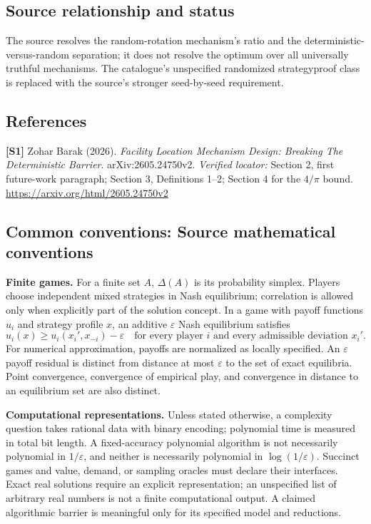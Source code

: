 \documentclass[11pt,a4paper]{article}
\begin{document}
\subsection*{Source relationship and status}
The source resolves the random-rotation mechanism's ratio and the deterministic-versus-random separation; it does not resolve the optimum over all universally truthful mechanisms. The catalogue's unspecified randomized strategyproof class is replaced with the source's stronger seed-by-seed requirement.
\subsection*{References}
\begingroup\footnotesize\raggedright
\textbf{[S1]} Zohar Barak (2026). \emph{Facility Location Mechanism Design: Breaking The Deterministic Barrier}. arXiv:2605.24750v2. \textit{Verified locator:} Section 2, first future-work paragraph; Section 3, Definitions 1--2; Section 4 for the $4/\pi$ bound. \url{https://arxiv.org/html/2605.24750v2}
\par\endgroup

\subsection*{Common conventions: Source mathematical conventions}

\textbf{Finite games.} For a finite set $A$, $\Delta(A)$ is its probability
simplex. Players choose independent mixed strategies in Nash equilibrium;
correlation is allowed only when explicitly part of the solution concept.
In a game with payoff functions $u_i$ and strategy profile $x$, an additive
$\varepsilon$ Nash equilibrium satisfies
\[
 u_i(x)\geq u_i(x_i',x_{-i})-\varepsilon
 \quad\text{for every player $i$ and every admissible deviation $x_i'$}.
\]
For numerical approximation, payoffs are normalized as locally specified.
An $\varepsilon$ payoff residual is distinct from distance at most
$\varepsilon$ to the set of exact equilibria. Point convergence, convergence
of empirical play, and convergence in distance to an equilibrium set are
also distinct.

\textbf{Computational representations.} Unless stated otherwise, a complexity
question takes rational data with binary encoding; polynomial time is measured
in total bit length. A fixed-accuracy polynomial algorithm is not necessarily
polynomial in $1/\varepsilon$, and neither is necessarily polynomial in
$\log(1/\varepsilon)$. Succinct games and value, demand, or sampling oracles
must declare their interfaces. Exact real solutions require an explicit
representation; an unspecified list of arbitrary real numbers is not a
finite computational output. A claimed algorithmic barrier is meaningful
only for its specified model and reductions.
\end{document}
